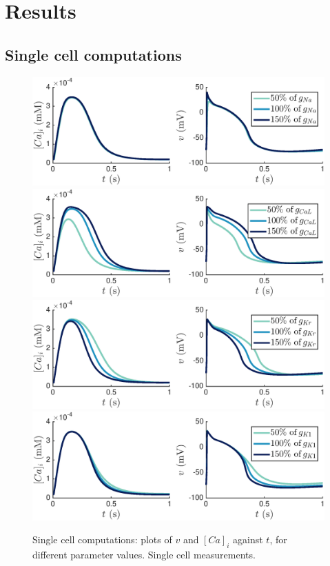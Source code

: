 \documentclass[12pt,a4paper]{article}
\begin{document}
\section{Results} \label{Results}
\subsection{Single cell computations} \label{Single cell computations}
%
\begin{figure}
   \includegraphics[trim=0cm 0cm 0cm 0cm, clip=true, width=1\linewidth]{sc_gna} 
   \includegraphics[trim=0cm 0cm 0cm 0cm, clip=true, width=1\linewidth]{sc_gcal} 
      \includegraphics[trim=0cm 0cm 0cm 0cm, clip=true, width=1\linewidth]{sc_gkr} 
         \includegraphics[trim=0cm 0cm 0cm 0cm, clip=true, width=1\linewidth]{sc_gk1} 
    \caption{Single cell computations: plots of $v$ and $[Ca]_i$ against $t$, for different parameter values. Single cell measurements.}
    \label{fig:4a}
\end{figure}
\end{document}
